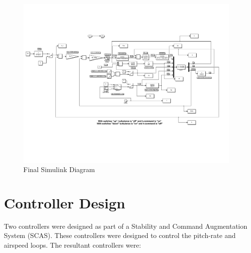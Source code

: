 \documentclass[12pt]{article}
\begin{document}
\begin{figure}[b!]
\begin{center}
\includegraphics[width=1\textwidth]{figures/final_simulink}
\caption{Final Simulink Diagram}
\end{center}
\end{figure}

\clearpage
\section{Controller Design}
Two controllers were designed as part of a Stability and Command Augmentation System (SCAS). These controllers were designed to control the pitch-rate and airspeed loops. The resultant controllers were:
\end{document}
